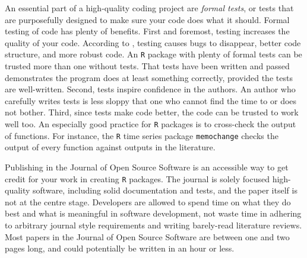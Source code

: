 An essential part of a high-quality coding project are \emph{formal tests}, or tests that are purposefully designed to make sure your code does what it should. Formal testing of code has plenty of benefits. First and foremost, testing increases the quality of your code. According to \textcite[Chapter 7]{Wickham2015-ik}, testing causes bugs to disappear, better code structure, and more robust code. An \texttt{R} package with plenty of formal tests can be trusted more than one without tests. That tests have been written and passed demonstrates the program does at least something correctly, provided the tests are well-written. Second, tests inspire confidence in the authors. An author who carefully writes tests is less sloppy that one who cannot find the time to or does not bother. Third, since tests make code better, the code can be trusted to work well too. An especially good practice for \texttt{R} packages is to cross-check the output of functions. For instance, the \texttt{R} time series package \texttt{memochange} \parencite{memochange} checks the output of every function against outputs in the literature.

Publishing in the Journal of Open Source Software is an accessible way to get credit for your work in creating \texttt{R} packages. The journal is solely focused high-quality software, including solid documentation and tests, and the paper itself is not at the centre stage. Developers are allowed to spend time on what they do best and what is meaningful in software development, not waste time in adhering to arbitrary journal style requirements and writing barely-read literature reviews. Most papers in the Journal of Open Source Software are between one and two pages long, and could potentially be written in an hour or less. 